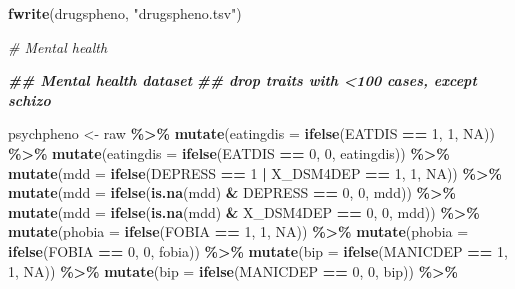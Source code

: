 \documentclass[
]{article}
\newenvironment{Shaded}{\begin{snugshade}}{\end{snugshade}}
\newcommand{\AttributeTok}[1]{\textcolor[rgb]{0.13,0.29,0.53}{#1}}
\newcommand{\CommentTok}[1]{\textcolor[rgb]{0.56,0.35,0.01}{\textit{#1}}}
\newcommand{\ConstantTok}[1]{\textcolor[rgb]{0.56,0.35,0.01}{#1}}
\newcommand{\DecValTok}[1]{\textcolor[rgb]{0.00,0.00,0.81}{#1}}
\newcommand{\DocumentationTok}[1]{\textcolor[rgb]{0.56,0.35,0.01}{\textbf{\textit{#1}}}}
\newcommand{\FunctionTok}[1]{\textcolor[rgb]{0.13,0.29,0.53}{\textbf{#1}}}
\newcommand{\NormalTok}[1]{#1}
\newcommand{\OtherTok}[1]{\textcolor[rgb]{0.56,0.35,0.01}{#1}}
\newcommand{\SpecialCharTok}[1]{\textcolor[rgb]{0.81,0.36,0.00}{\textbf{#1}}}
\newcommand{\StringTok}[1]{\textcolor[rgb]{0.31,0.60,0.02}{#1}}
\begin{document}
\begin{Shaded}
\begin{Highlighting}[]
\FunctionTok{fwrite}\NormalTok{(drugspheno, }\StringTok{"drugspheno.tsv"}\NormalTok{)}


\CommentTok{\# Mental health}

\DocumentationTok{\#\# Mental health dataset}
\DocumentationTok{\#\# drop traits with \textless{}100 cases, except schizo}

\NormalTok{psychpheno }\OtherTok{\textless{}{-}}\NormalTok{ raw }\SpecialCharTok{\%\textgreater{}\%} 
  \FunctionTok{mutate}\NormalTok{(}\AttributeTok{eatingdis =} \FunctionTok{ifelse}\NormalTok{(EATDIS }\SpecialCharTok{==} \DecValTok{1}\NormalTok{, }\DecValTok{1}\NormalTok{, }\ConstantTok{NA}\NormalTok{)) }\SpecialCharTok{\%\textgreater{}\%} 
  \FunctionTok{mutate}\NormalTok{(}\AttributeTok{eatingdis =} \FunctionTok{ifelse}\NormalTok{(EATDIS }\SpecialCharTok{==} \DecValTok{0}\NormalTok{, }\DecValTok{0}\NormalTok{, eatingdis)) }\SpecialCharTok{\%\textgreater{}\%} 
  \FunctionTok{mutate}\NormalTok{(}\AttributeTok{mdd =} \FunctionTok{ifelse}\NormalTok{(DEPRESS }\SpecialCharTok{==} \DecValTok{1} \SpecialCharTok{|}\NormalTok{ X\_DSM4DEP }\SpecialCharTok{==} \DecValTok{1}\NormalTok{, }\DecValTok{1}\NormalTok{, }\ConstantTok{NA}\NormalTok{)) }\SpecialCharTok{\%\textgreater{}\%} 
  \FunctionTok{mutate}\NormalTok{(}\AttributeTok{mdd =} \FunctionTok{ifelse}\NormalTok{(}\FunctionTok{is.na}\NormalTok{(mdd) }\SpecialCharTok{\&}\NormalTok{ DEPRESS }\SpecialCharTok{==} \DecValTok{0}\NormalTok{, }\DecValTok{0}\NormalTok{, mdd)) }\SpecialCharTok{\%\textgreater{}\%} 
  \FunctionTok{mutate}\NormalTok{(}\AttributeTok{mdd =} \FunctionTok{ifelse}\NormalTok{(}\FunctionTok{is.na}\NormalTok{(mdd) }\SpecialCharTok{\&}\NormalTok{ X\_DSM4DEP }\SpecialCharTok{==} \DecValTok{0}\NormalTok{, }\DecValTok{0}\NormalTok{, mdd)) }\SpecialCharTok{\%\textgreater{}\%} 
  \FunctionTok{mutate}\NormalTok{(}\AttributeTok{phobia =} \FunctionTok{ifelse}\NormalTok{(FOBIA }\SpecialCharTok{==} \DecValTok{1}\NormalTok{, }\DecValTok{1}\NormalTok{, }\ConstantTok{NA}\NormalTok{)) }\SpecialCharTok{\%\textgreater{}\%} 
  \FunctionTok{mutate}\NormalTok{(}\AttributeTok{phobia =} \FunctionTok{ifelse}\NormalTok{(FOBIA }\SpecialCharTok{==} \DecValTok{0}\NormalTok{, }\DecValTok{0}\NormalTok{, fobia)) }\SpecialCharTok{\%\textgreater{}\%} 
  \FunctionTok{mutate}\NormalTok{(}\AttributeTok{bip =} \FunctionTok{ifelse}\NormalTok{(MANICDEP }\SpecialCharTok{==} \DecValTok{1}\NormalTok{, }\DecValTok{1}\NormalTok{, }\ConstantTok{NA}\NormalTok{)) }\SpecialCharTok{\%\textgreater{}\%} 
  \FunctionTok{mutate}\NormalTok{(}\AttributeTok{bip =} \FunctionTok{ifelse}\NormalTok{(MANICDEP }\SpecialCharTok{==} \DecValTok{0}\NormalTok{, }\DecValTok{0}\NormalTok{, bip)) }\SpecialCharTok{\%\textgreater{}\%}   

\end{Highlighting}
\end{Shaded}
\end{document}

